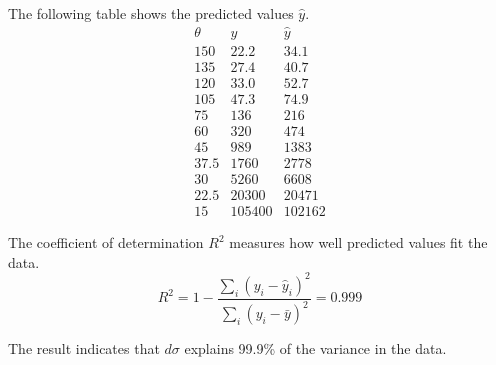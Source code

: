 The following table shows the predicted values $\hat y$.
\begin{equation*}
\begin{matrix}
\theta & y & \hat y\\
150 & 22.2 & 34.1\\
135 & 27.4 & 40.7\\
120 & 33.0 & 52.7\\
105 & 47.3 & 74.9\\
75 & 136 & 216\\
60 & 320 & 474\\
45 & 989 & 1383\\
37.5 & 1760 & 2778\\
30 & 5260 & 6608\\
22.5 & 20300 & 20471\\
15 & 105400 & 102162
\end{matrix}
\end{equation*}

The coefficient of determination $R^2$ measures how well predicted values fit the data.
\begin{equation*}
R^2=1-\frac{\sum_i(y_i-\hat y_i)^2}{\sum_i(y_i-\bar y)^2}=0.999
\end{equation*}

The result indicates that $d\sigma$ explains 99.9\%
of the variance in the data.


